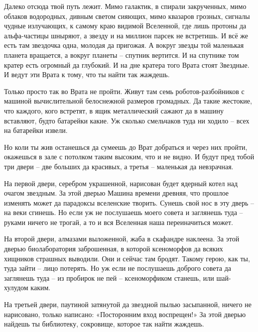 \documentclass[ebook,oneside,final,openright]{memoir}
\begin{document}
\par
Далеко отсюда твой путь лежит. Мимо галактик, в спирали закрученных, мимо облаков водородных, дивным светом сияющих, мимо квазаров грозных, сигналы чудные излучающих, к самому краю видимой Вселенной, где лишь протоны да альфа-частицы шныряют, а звезду и на миллион парсек не встретишь. И всё же есть там звездочка одна, молодая да пригожая. А вокруг звезды той маленькая планета вращается, а вокруг планеты – спутник вертится. И на спутнике том кратер есть огромный да глубокий. И на дне кратера того Врата стоят Звездные. И ведут эти Врата к тому, что ты найти так жаждешь.\par
\par
Только просто так во Врата не пройти. Живут там семь роботов-разбойников с машиной вычислительной белоснежной размеров громадных. Да такие жестокие, что каждого, кого встретят, в ящик металлический сажают да в машину вставляют, будто батарейки какие. Уж сколько смельчаков туда ни ходило – всех на батарейки извели.\par
\par
Но коли ты жив останешься да сумеешь до Врат добраться и через них пройти, окажешься в зале с потолком таким высоким, что и не видно. И будут пред тобой три двери – две больших да красивых, а третья – маленькая да невзрачная.\par
\par
На первой двери, серебром украшенной, нарисован будет ядерный котел над очагом звездным. За этой дверью Машина времени древняя, что прошлое изменять может да парадоксы вселенские творить. Сунешь свой нос в эту дверь – на веки сгинешь. Но если уж не послушаешь моего совета и заглянешь туда – руками ничего не трогай, а то и вся Вселенная наша переиначиться может.\par
\par
На второй двери, алмазами выложенной, жаба в скафандре наклеена. За этой дверью биолаборатория заброшенная, в которой ксеноморфов да всяких хищников страшных выводили. Они и сейчас там бродят. Такому герою, как ты, туда зайти – лицо потерять. Но уж если не послушаешь доброго совета да заглянешь туда – из пробирок не пей – ксеноморфиком станешь, или шай-хулудом каким.\par
\par
На третьей двери, паутиной затянутой да звездной пылью засыпанной, ничего не нарисовано, только написано: «Посторонним вход воспрещен!» За этой дверью найдешь ты библиотеку, сокровище, которое так найти жаждешь.\par
\par
\end{document}
